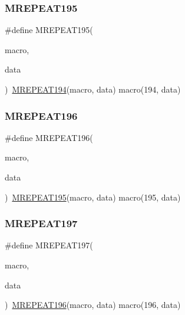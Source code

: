 \mbox{\label{group__group__sam0__utils__mrepeat_ga9b1f8ebc91ab6f86e156010f11811cfa}} 
\subsubsection{\texorpdfstring{MREPEAT195}{MREPEAT195}}
{\footnotesize\ttfamily \#define M\+R\+E\+P\+E\+A\+T195(\begin{DoxyParamCaption}\item[{}]{macro,  }\item[{}]{data }\end{DoxyParamCaption})~\mbox{\hyperlink{group__group__sam0__utils__mrepeat_gad99185ad8f1a4a6a5597cf80d2ef1453}{M\+R\+E\+P\+E\+A\+T194}}(macro, data)   macro(194, data)}

\mbox{\label{group__group__sam0__utils__mrepeat_ga960fa8ced64817d70ae389a75693f351}} 
\subsubsection{\texorpdfstring{MREPEAT196}{MREPEAT196}}
{\footnotesize\ttfamily \#define M\+R\+E\+P\+E\+A\+T196(\begin{DoxyParamCaption}\item[{}]{macro,  }\item[{}]{data }\end{DoxyParamCaption})~\mbox{\hyperlink{group__group__sam0__utils__mrepeat_ga9b1f8ebc91ab6f86e156010f11811cfa}{M\+R\+E\+P\+E\+A\+T195}}(macro, data)   macro(195, data)}

\mbox{\label{group__group__sam0__utils__mrepeat_ga8d5a1466ff85f6b12ce43dd9a5edf7e5}} 
\subsubsection{\texorpdfstring{MREPEAT197}{MREPEAT197}}
{\footnotesize\ttfamily \#define M\+R\+E\+P\+E\+A\+T197(\begin{DoxyParamCaption}\item[{}]{macro,  }\item[{}]{data }\end{DoxyParamCaption})~\mbox{\hyperlink{group__group__sam0__utils__mrepeat_ga960fa8ced64817d70ae389a75693f351}{M\+R\+E\+P\+E\+A\+T196}}(macro, data)   macro(196, data)}

